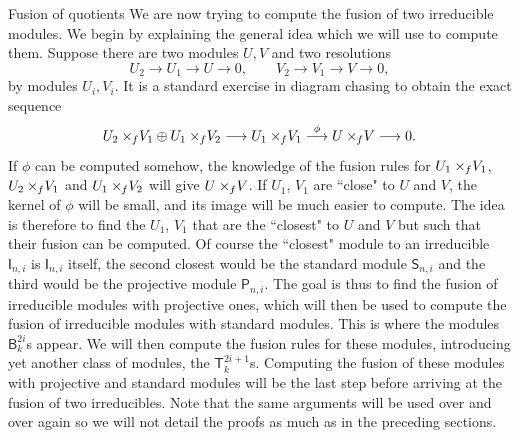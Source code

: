 \documentclass[reqno]{amsart}
\newcommand{\ds}[1]{\mathsf S_{#1}}
\newcommand{\dl}[1]{\mathsf I_{#1}}
\newcommand{\dP}[1]{\mathsf P_{#1}}
\newcommand{\xf}{\times\hspace{-0.27em}_f}
\newcommand{\T}[2]{\mathsf{T}^{#1}_{#2}}
\newcommand{\B}[2]{\mathsf{B}^{#1}_{#2}}
\begin{document}
\begin{section}{Fusion of quotients}\label{sec:fusionquotients}
We are now trying to compute the fusion of two irreducible modules. We begin by explaining the general idea which we will use to compute them. Suppose there are two modules $U,V$ and two resolutions $$U_{2} \longrightarrow U_{1} \longrightarrow U \longrightarrow 0, \qquad V_{2} \longrightarrow V_{1} \longrightarrow V \longrightarrow 0,  $$ by modules $U_{i},V_{i}$. It is a standard exercise in diagram chasing to obtain the exact sequence 
\begin{equation}
U_{2}\xf V_{1} \oplus U_{1}\xf V_{2} \longrightarrow U_{1} \xf V_{1} \overset{\phi}{\longrightarrow} U \xf V \longrightarrow 0.
\end{equation}
If $\phi$ can be computed somehow, the knowledge of the fusion rules for $U_{1} \xf V_{1}$, $U_{2} \xf V_{1}$ and $U_{1} \xf V_{2}$ will give $U \xf V$. If $U_{1}$, $V_{1}$ are ``close" to $U$ and $V$, the kernel of $\phi$ will be small, and its image will be much easier to compute. The idea is therefore to find the $U_{1}$, $V_{1}$ that are the ``closest" to $U$ and $V$ but such that their fusion can be computed. Of course the ``closest" module to an irreducible $\dl{n,i}$ is $\dl{n,i}$ itself, the second closest would be the standard module $\ds{n,i}$ and the third would be the projective module $\dP{n,i}$. The goal is thus to find the fusion of irreducible modules with  projective ones, which will then be used to compute the fusion of irreducible modules with standard modules. This is where the modules $\B{2i}{k}$s appear. We will then compute the fusion rules for these modules, introducing yet another class of modules, the $\T{2i+1}{k}$s. Computing the fusion of these modules with projective and standard modules will be the last step before arriving at the fusion of two irreducibles. Note that the same arguments will be used over and over again so we will not detail the proofs as much as in the preceding sections.

\end{section}
\end{document}
